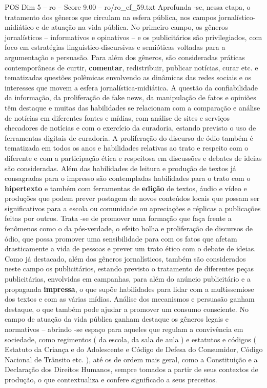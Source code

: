\begin{textsample}{POS Dim 5 – ro – Score 9.00 – ro/ro\_ef\_59.txt}
Aprofunda -se, nessa etapa, o tratamento dos gêneros que circulam na esfera pública, nos campos jornalístico-midiático e de atuação na vida pública.
No primeiro campo, os gêneros jornalísticos – informativos e opinativos – e os publicitários são privilegiados, com foco em estratégias linguístico-discursivas e semióticas voltadas para a argumentação e persuasão.
Para além dos gêneros, são consideradas práticas contemporâneas de curtir, \textbf{comentar}, redistribuir, publicar notícias, curar etc. e tematizadas questões polêmicas envolvendo as dinâmicas das redes sociais e os interesses que movem a esfera jornalística-midiática.
A questão da confiabilidade da informação, da proliferação de fake news, da manipulação de fatos e opiniões têm destaque e muitas das habilidades se relacionam com a comparação e análise de notícias em diferentes fontes e mídias, com análise de sites e serviços checadores de notícias e com o exercício da curadoria, estando previsto o uso de ferramentas digitais de curadoria.
A proliferação do discurso de ódio também é tematizada em todos os anos e habilidades relativas ao trato e respeito com o diferente e com a participação ética e respeitosa em discussões e debates de ideias são consideradas.
Além das habilidades de leitura e produção de textos já consagradas para o impresso são contempladas habilidades para o trato com o \textbf{hipertexto} e também com ferramentas de \textbf{edição} de textos, áudio e vídeo e produções que podem prever postagem de novos conteúdos locais que possam ser significativos para a escola ou comunidade ou apreciações e réplicas a publicações feitas por outros.
Trata -se de promover uma formação que faça frente a fenômenos como o da pós-verdade, o efeito bolha e proliferação de discursos de ódio, que possa promover uma sensibilidade para com os fatos que afetam drasticamente a vida de pessoas e prever um trato ético com o debate de ideias.
Como já destacado, além dos gêneros jornalísticos, também são considerados neste campo os publicitários, estando previsto o tratamento de diferentes peças publicitárias, envolvidas em campanhas, para além do anúncio publicitário e a propaganda \textbf{impressa}, o que supõe habilidades para lidar com a multissemiose dos textos e com as várias mídias.
Análise dos mecanismos e persuasão ganham destaque, o que também pode ajudar a promover um consumo consciente.
No campo de atuação da vida pública ganham destaque os gêneros legais e normativos – abrindo -se espaço para aqueles que regulam a convivência em sociedade, como regimentos ( da escola, da sala de aula ) e estatutos e códigos ( Estatuto da Criança e do Adolescente e Código de Defesa do Consumidor, Código Nacional de Trânsito etc. ), até os de ordem mais geral, como a Constituição e a Declaração dos Direitos Humanos, sempre tomados a partir de seus contextos de produção, o que contextualiza e confere significado a seus preceitos.

\end{textsample}

